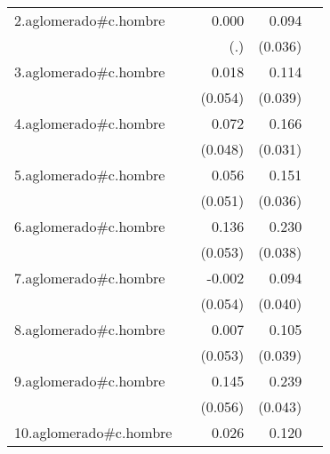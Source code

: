 {\begin{longtable}{l*{4}{D{.}{.}{-1}}}
\addlinespace
2.aglomerado#c.hombre&                     &       0.000         &       0.094\sym{**} &                     \\
            &                     &         (.)         &     (0.036)         &                     \\
\addlinespace
3.aglomerado#c.hombre&                     &       0.018         &       0.114\sym{**} &                     \\
            &                     &     (0.054)         &     (0.039)         &                     \\
\addlinespace
4.aglomerado#c.hombre&                     &       0.072         &       0.166\sym{***}&                     \\
            &                     &     (0.048)         &     (0.031)         &                     \\
\addlinespace
5.aglomerado#c.hombre&                     &       0.056         &       0.151\sym{***}&                     \\
            &                     &     (0.051)         &     (0.036)         &                     \\
\addlinespace
6.aglomerado#c.hombre&                     &       0.136\sym{*}  &       0.230\sym{***}&                     \\
            &                     &     (0.053)         &     (0.038)         &                     \\
\addlinespace
7.aglomerado#c.hombre&                     &      -0.002         &       0.094\sym{*}  &                     \\
            &                     &     (0.054)         &     (0.040)         &                     \\
\addlinespace
8.aglomerado#c.hombre&                     &       0.007         &       0.105\sym{**} &                     \\
            &                     &     (0.053)         &     (0.039)         &                     \\
\addlinespace
9.aglomerado#c.hombre&                     &       0.145\sym{*}  &       0.239\sym{***}&                     \\
            &                     &     (0.056)         &     (0.043)         &                     \\
\addlinespace
10.aglomerado#c.hombre&                     &       0.026         &       0.120\sym{***}&                     \\

\end{longtable}}
